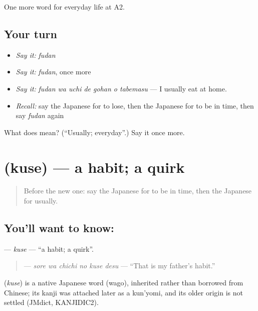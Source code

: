 \begin{grammarlens}[title={What you've built}]
One more word for everyday life at A2.
\end{grammarlens}

\subsection*{Your turn}
\begin{itemize}
\raggedright
  \item \emph{Say it:} \emph{fudan}
  \item \emph{Say it:} \emph{fudan}, once more
  \item \emph{Say it:} \emph{fudan wa uchi de gohan o tabemasu} — I usually eat at home.
  \item \emph{Recall:} say the Japanese for to lose, then the Japanese for to be in time, then say \emph{fudan} again
\end{itemize}

\begin{tcolorbox}[breakable,colback=teal!4,colframe=teal!35!black,title={Before you move on}]
What does  mean? (\textquotedblleft{}Usually; everyday\textquotedblright{}.) Say it once more.
\end{tcolorbox}
\section[\texorpdfstring{\ja{くせ} (kuse)}{くせ (kuse)}]{ (kuse) — a habit; a quirk}

\label{lesson:JA-C154-kuse}



\begin{quote}
Before the new one: say the Japanese for to be in time, then the Japanese for usually.
\end{quote}

\subsection*{You'll want to know: }
\textbf{} — \emph{kuse} — \textquotedblleft{}a habit; a quirk\textquotedblright{}.

\begin{quote}
\textbf{  } — \emph{sore wa chichi no kuse desu} — \textquotedblleft{}That is my father's habit.\textquotedblright{}
\end{quote}

\begin{cousinweb}
\textbf{} (\emph{kuse}) is a native Japanese word (wago), inherited rather than borrowed from Chinese; its kanji was attached later as a kun'yomi, and its older origin is not settled (JMdict, KANJIDIC2).
\end{cousinweb}

